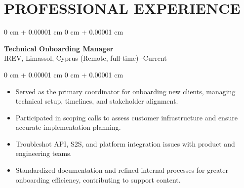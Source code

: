 \documentclass[10pt, letterpaper]{article}
\newenvironment{highlights}{
    \begin{itemize}[
        topsep=0.10 cm,
        parsep=0.10 cm,
        partopsep=0pt,
        itemsep=0pt,
        leftmargin=0 cm + 10pt
    ]
}{
    \end{itemize}
}
\newenvironment{onecolentry}{
    \begin{adjustwidth}{
        0 cm + 0.00001 cm
    }{
        0 cm + 0.00001 cm
    }
}{
    \end{adjustwidth}
}
\begin{document}
\section{PROFESSIONAL EXPERIENCE}

\begin{onecolentry}
    \setcolumnwidth{\fill, 4.5cm}
    \begin{paracol}{2}
        \textbf{Technical Onboarding Manager} \\ IREV, Limassol, Cyprus (Remote, full-time)
        \switchcolumn
        -Current
    \end{paracol}
\end{onecolentry}
\vspace{0.10cm}
\begin{onecolentry}
    \begin{highlights}
                \item Served as the primary coordinator for onboarding new clients, managing technical setup, timelines, and stakeholder alignment.
                \item Participated in scoping calls to assess customer infrastructure and ensure accurate implementation planning.
                \item Troubleshot API, S2S, and platform integration issues with product and engineering teams.
                \item Standardized documentation and refined internal processes for greater onboarding efficiency, contributing to support content.
    \end{highlights}
\end{onecolentry}

\vspace{0.2cm}
\end{document}
